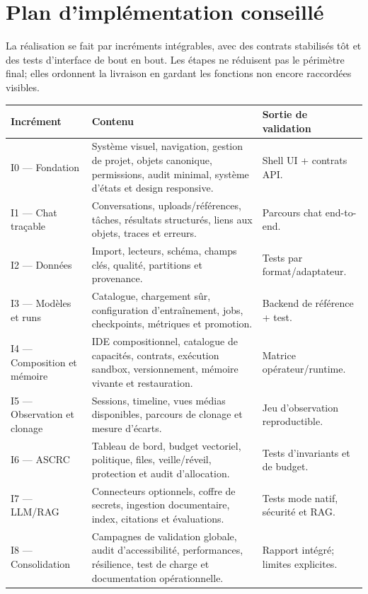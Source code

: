 \documentclass[11pt,a4paper]{article}
\begin{document}
\section{Plan d'implémentation conseillé}
La réalisation se fait par incréments intégrables, avec des contrats stabilisés tôt et des tests d'interface de bout en bout. Les étapes ne réduisent pas le périmètre final; elles ordonnent la livraison en gardant les fonctions non encore raccordées visibles.
\begin{longtable}{p{}p{}p{}}
\toprule
\textbf{Incrément} & \textbf{Contenu} & \textbf{Sortie de validation}\\
\midrule
I0 — Fondation & Système visuel, navigation, gestion de projet, objets canonique, permissions, audit minimal, système d'états et design responsive. & Shell UI + contrats API.\\
I1 — Chat traçable & Conversations, uploads/références, tâches, résultats structurés, liens aux objets, traces et erreurs. & Parcours chat end-to-end.\\
I2 — Données & Import, lecteurs, schéma, champs clés, qualité, partitions et provenance. & Tests par format/adaptateur.\\
I3 — Modèles et runs & Catalogue, chargement sûr, configuration d'entraînement, jobs, checkpoints, métriques et promotion. & Backend de référence + test.\\
I4 — Composition et mémoire & IDE compositionnel, catalogue de capacités, contrats, exécution sandbox, versionnement, mémoire vivante et restauration. & Matrice opérateur/runtime.\\
I5 — Observation et clonage & Sessions, timeline, vues médias disponibles, parcours de clonage et mesure d'écarts. & Jeu d'observation reproductible.\\
I6 — ASCRC & Tableau de bord, budget vectoriel, politique, files, veille/réveil, protection et audit d'allocation. & Tests d'invariants et de budget.\\
I7 — LLM/RAG & Connecteurs optionnels, coffre de secrets, ingestion documentaire, index, citations et évaluations. & Tests mode natif, sécurité et RAG.\\
I8 — Consolidation & Campagnes de validation globale, audit d'accessibilité, performances, résilience, test de charge et documentation opérationnelle. & Rapport intégré; limites explicites.\\
\bottomrule
\end{longtable}
\end{document}
